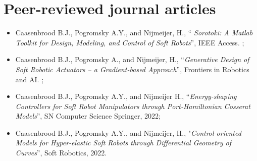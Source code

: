 \section*{Peer-reviewed journal articles}
\begin{itemize}[leftmargin=2mm]
\small
\setlength\itemsep{0.0em}
\item Caasenbrood B.J., Pogromsky A.Y., and Nijmeijer, H., “\textit{ Sorotoki: A Matlab Toolkit for Design, Modeling, and Control of Soft Robots}”, IEEE Access. \ipj;

\item Caasenbrood B.J., Pogromsky A., and Nijmeijer, H., “\textit{Generative Design of Soft Robotic Actuators -- a Gradient-based Approach}”, Frontiers in Robotics and AI. \ipj;

\item  Caasenbrood B.J., Pogromsky A.Y., and Nijmeijer H., “\textit{Energy-shaping Controllers for Soft Robot Manipulators through Port-Hamiltonian Cosserat Models}”, SN Computer Science Springer, 2022;
\item Caasenbrood B.J., Pogromsky A.Y., and Nijmeijer, H., "\textit{Control-oriented Models for Hyper-elastic Soft Robots through Differential Geometry of Curves}”, Soft Robotics, 2022.
\end{itemize}

